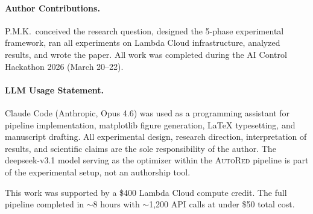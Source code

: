 \documentclass{article}
\newcommand{\ours}{\textsc{AutoRed}}
\begin{document}
\paragraph{Author Contributions.} P.M.K.\ conceived the research question, designed the 5-phase experimental framework, ran all experiments on Lambda Cloud infrastructure, analyzed results, and wrote the paper. All work was completed during the AI Control Hackathon 2026 (March 20--22).

\paragraph{LLM Usage Statement.} Claude Code (Anthropic, Opus 4.6) was used as a programming assistant for pipeline implementation, matplotlib figure generation, LaTeX typesetting, and manuscript drafting. All experimental design, research direction, interpretation of results, and scientific claims are the sole responsibility of the author. The deepseek-v3.1 model serving as the optimizer within the \ours{} pipeline is part of the experimental setup, not an authorship tool.

\begin{ack}
This work was supported by a \$400 Lambda Cloud compute credit. The full pipeline completed in ${\sim}$8 hours with ${\sim}$1{,}200 API calls at under \$50 total cost.
\end{ack}

{\small


}
\end{document}
